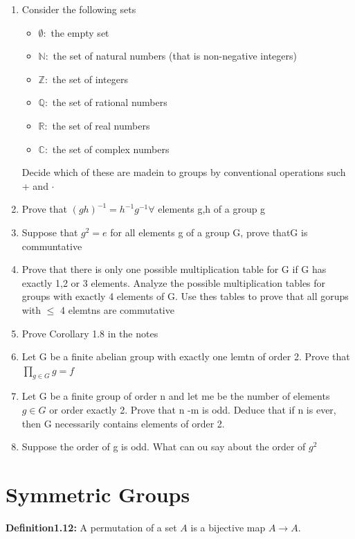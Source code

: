 \begin{enumerate}
    \item Consider the following sets
        \begin{itemize}
                \item $\emptyset : $ the empty set
                \item $\mathbb{N}:$ the set of natural numbers (that is non-negative integers)
                \item $\mathbb{Z}:$ the set of integers
                \item $\mathbb{Q}:$ the set of rational numbers
                \item $\mathbb{R}:$ the set of real numbers
                \item $\mathbb{C}:$ the set of complex numbers
            \end{itemize}
            Decide which of these are madein to groups by conventional operations such + and $\cdot$
    \item Prove that $(gh)^{-1} = h^{-1}g^{-1} \forall$ elements g,h of a group g
    \item Suppose that $g^2 = e $ for all elements g of a group G,  prove thatG is communtative
    \item Prove that there is only one possible multiplication table for G if G has exactly 1,2 or 3 elements. Analyze the possible multiplication tables for groups with exactly 4 elements of G. Use thes tables to prove that all gorups with $\le$ 4 elemtns are commutative
    \item Prove Corollary 1.8 in the notes
    \item Let G be a finite abelian group with exactly one lemtn of order 2. Prove that $\prod_{g \in G} g = f$
    \item Let G be a finite group of order n and let me be the number of elements $g \in G$ or order exactly 2. Prove that n -m is odd. Deduce that if n is ever, then G necessarily contains elements of order 2.
    \item Suppose the order of g is odd. What can ou say about the order of $g^2$
\end{enumerate}

\section*{Symmetric Groups} %

\textbf{Definition1.12:} A permutation of a set $A$ is a bijective map $A \to A$. %

